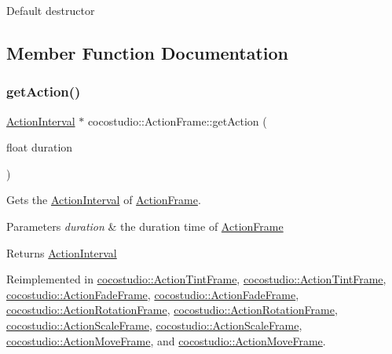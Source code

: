 Default destructor 

\subsection{Member Function Documentation}
\mbox{\label{classcocostudio_1_1ActionFrame_a375216a44f6643d5e771299b1236dc51}} 
\subsubsection{\texorpdfstring{get\+Action()}{getAction()}\hspace{0.1cm}{\footnotesize\ttfamily [1/4]}}
{\footnotesize\ttfamily \hyperlink{classActionInterval}{Action\+Interval} $\ast$ cocostudio\+::\+Action\+Frame\+::get\+Action (\begin{DoxyParamCaption}\item[{float}]{duration }\end{DoxyParamCaption})\hspace{0.3cm}{\ttfamily [virtual]}}

Gets the \hyperlink{classActionInterval}{Action\+Interval} of \hyperlink{classcocostudio_1_1ActionFrame}{Action\+Frame}.


\begin{DoxyParams}{Parameters}
{\em duration} & the duration time of \hyperlink{classcocostudio_1_1ActionFrame}{Action\+Frame}\\
\hline
\end{DoxyParams}
\begin{DoxyReturn}{Returns}
\hyperlink{classActionInterval}{Action\+Interval} 
\end{DoxyReturn}


Reimplemented in \hyperlink{classcocostudio_1_1ActionTintFrame_a819d36221cd38cabd0a7936871578752}{cocostudio\+::\+Action\+Tint\+Frame}, \hyperlink{classcocostudio_1_1ActionTintFrame_ad1329f3513d3c40369182872a08d543e}{cocostudio\+::\+Action\+Tint\+Frame}, \hyperlink{classcocostudio_1_1ActionFadeFrame_a8c4fd77023be47a8879597c06b89e2a1}{cocostudio\+::\+Action\+Fade\+Frame}, \hyperlink{classcocostudio_1_1ActionFadeFrame_a666690711af56eb3dbe6e39c43655f08}{cocostudio\+::\+Action\+Fade\+Frame}, \hyperlink{classcocostudio_1_1ActionRotationFrame_a6ca8b34044106cf7e71dc9fe301d5b5a}{cocostudio\+::\+Action\+Rotation\+Frame}, \hyperlink{classcocostudio_1_1ActionRotationFrame_af44596d9558e7b904a77b1ca504e74b5}{cocostudio\+::\+Action\+Rotation\+Frame}, \hyperlink{classcocostudio_1_1ActionScaleFrame_a7952170933c3dde44525f8917d2e661a}{cocostudio\+::\+Action\+Scale\+Frame}, \hyperlink{classcocostudio_1_1ActionScaleFrame_a7835af6973dddcd7714efd7c45c9bc80}{cocostudio\+::\+Action\+Scale\+Frame}, \hyperlink{classcocostudio_1_1ActionMoveFrame_acdacf22506bf13d5214f70d25b7cfed8}{cocostudio\+::\+Action\+Move\+Frame}, and \hyperlink{classcocostudio_1_1ActionMoveFrame_a57f58bf872a13797b7b121c0bb40793e}{cocostudio\+::\+Action\+Move\+Frame}.

